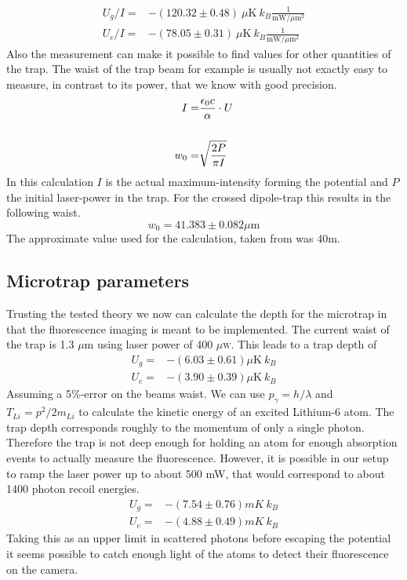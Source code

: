 \begin{align}
U_g/I=&-(120.32\pm 0.48)\ \mu\mathrm{K}\ k_B\frac{1}{\mathrm{mW}/\mu \mathrm{m}^2}\\
U_e/I=&-(78.05\pm 0.31)\ \mu\mathrm{K}\ k_B\frac{1}{\mathrm{mW}/\mu \mathrm{m}^2}
\end{align}
Also the measurement can make it possible to find values for other quantities of the trap. The waist of the trap beam for example is usually not exactly easy to measure, in contrast to its power, that we know with good precision.
\begin{align}
I=&\frac{\epsilon_0 c}{\alpha}\cdot U\\\notag\\
w_0=&\sqrt{\frac{2P}{\pi I}}
\end{align}
In this calculation $I$ is the actual maximum-intensity forming the potential and $P$ the initial laser-power in the trap. For the crossed dipole-trap this results in the following waist.
\begin{equation}
w_0=41.383\pm 0.082 \mu \mathrm{m}
\end{equation}
The approximate value used for the calculation, taken from \cite{lompe} was 40\mu m.

\subsection{Microtrap parameters}

Trusting the tested theory we now can calculate the depth for the microtrap in that the fluorescence imaging is meant to be implemented. The current waist of the trap is 1.3 $\mu$m using laser power of 400 $\mu$\textsc{w}. This leads to a trap depth of
\begin{align}
U_g=&-(6.03\pm 0.61)\mu\mathrm{K}\ k_B\\
U_e=&-(3.90\pm 0.39)\mu\mathrm{K}\ k_B
\end{align}
Assuming a 5\%-error on the beams waist. We can use $p_\gamma=h/\lambda$ and $T_{Li}=p^2/2m_{Li}$ to calculate the kinetic energy of an excited Lithium-6 atom. The trap depth corresponds roughly to the momentum of only a single photon. Therefore the trap is not deep enough for holding an atom for enough absorption events to actually measure the fluorescence. However, it is possible in our setup to ramp the laser power up to about 500 mW, that would correspond to about 1400 photon recoil energies.
\begin{align}
U_g=&-(7.54\pm 0.76)\unit{mK}\ k_B\\
U_e=&-(4.88\pm 0.49)\unit{mK}\ k_B
\end{align}
Taking this as an upper limit in scattered photons before escaping the potential it seems possible to catch enough light of the atoms to detect their fluorescence on the camera. 

